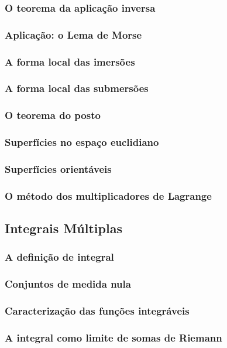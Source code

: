 \documentclass{article}
\theoremstyle{theorem}
\theoremstyle{lemma}
\theoremstyle{definition}
\theoremstyle{remark}
\begin{document}
   \subsubsection{O teorema da aplicação inversa}
   \subsubsection{Aplicação: o Lema de Morse}
   \subsubsection{ A forma local das imersões}
   \subsubsection{ A forma local das submersões}
   \subsubsection{ O teorema do posto}
   \subsubsection{ Superfícies no espaço euclidiano}
   \subsubsection{ Superfícies orientáveis}
   \subsubsection{ O método dos multiplicadores de Lagrange}

\subsection{ Integrais Múltiplas}
   \subsubsection{A definição de integral}
   \subsubsection{Conjuntos de medida nula}
   \subsubsection{Caracterização das funções integráveis}
   \subsubsection{A integral como limite de somas de Riemann}
\end{document}
